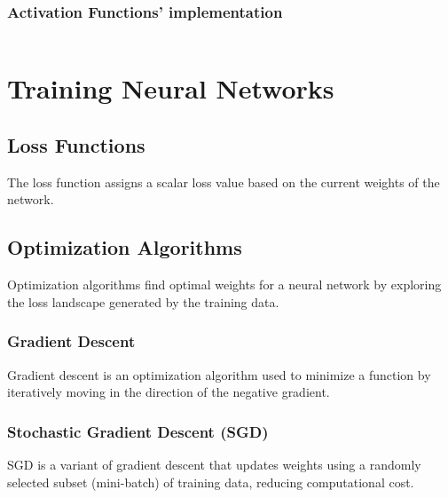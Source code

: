 \documentclass[a4paper,12pt]{article}
\begin{document}
\subsubsection{Activation Functions' implementation}
\inputminted[frame=lines, fontsize=\scriptsize, linenos]{python}{../../blue/activation_functions/activation_functions.py}

\section{Training Neural Networks}

\subsection{Loss Functions}
\begin{tcolorbox}[colback=blue!5!white,colframe=blue!75!black,title=Loss Function]
  The loss function assigns a scalar loss value based on the current weights of the network.
\end{tcolorbox}

\subsection{Optimization Algorithms}
Optimization algorithms find optimal weights for a neural network by exploring the loss
landscape generated by the training data.

\subsubsection{Gradient Descent}
\begin{tcolorbox}[colback=blue!5!white,colframe=blue!75!black,title=Gradient Descent]
  Gradient descent is an optimization algorithm used to minimize a function by iteratively moving in the direction of
  the negative gradient.
\end{tcolorbox}

\subsubsection{Stochastic Gradient Descent (SGD)}
\begin{tcolorbox}[colback=blue!5!white,colframe=blue!75!black,title=Stochastic Gradient Descent]
  SGD is a variant of gradient descent that updates weights using a randomly selected subset (mini-batch) of
  training data, reducing computational cost.
\end{tcolorbox}
\end{document}
